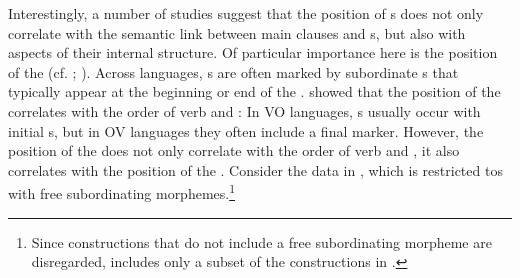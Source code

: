\documentclass[output=paper]{langsci/langscibook}
\begin{document}
Interestingly, a number of studies suggest that the position of s does not only correlate with the semantic link between main clauses and s, but also with aspects of their internal structure. Of particular importance here is the position of the  (cf. \citealt{Diessel2001}; \citealt{Schmidtke-Bode2009,Hetterle2015}). Across languages, s are often marked by subordinate s that typically appear at the beginning or end of the . \citet{Dryer1992} showed that the position of the  correlates with the order of verb and : In VO languages, s usually occur with initial s, but in OV languages they often include a final marker. However, the position of the  does not only correlate with the order of verb and , it also correlates with the position of the . Consider the data in , which is restricted tos with free subordinating morphemes.\footnote{Since  constructions that do not include a free subordinating morpheme are disregarded,  includes only a subset of the  constructions in .} 
\end{document}
